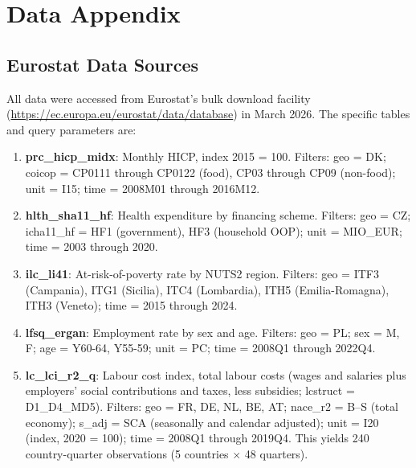 \documentclass[12pt]{article}
\begin{document}
\label{apep_main_text_end}
\newpage


\newpage
\appendix

\section{Data Appendix}
\label{app:data}

\subsection{Eurostat Data Sources}

All data were accessed from Eurostat's bulk download facility (\url{https://ec.europa.eu/eurostat/data/database}) in March 2026. The specific tables and query parameters are:

\begin{enumerate}
    \item \textbf{prc\_hicp\_midx}: Monthly HICP, index 2015 = 100. Filters: geo = DK; coicop = CP0111 through CP0122 (food), CP03 through CP09 (non-food); unit = I15; time = 2008M01 through 2016M12.

    \item \textbf{hlth\_sha11\_hf}: Health expenditure by financing scheme. Filters: geo = CZ; icha11\_hf = HF1 (government), HF3 (household OOP); unit = MIO\_EUR; time = 2003 through 2020.

    \item \textbf{ilc\_li41}: At-risk-of-poverty rate by NUTS2 region. Filters: geo = ITF3 (Campania), ITG1 (Sicilia), ITC4 (Lombardia), ITH5 (Emilia-Romagna), ITH3 (Veneto); time = 2015 through 2024.

    \item \textbf{lfsq\_ergan}: Employment rate by sex and age. Filters: geo = PL; sex = M, F; age = Y60-64, Y55-59; unit = PC; time = 2008Q1 through 2022Q4.

    \item \textbf{lc\_lci\_r2\_q}: Labour cost index, total labour costs (wages and salaries plus employers' social contributions and taxes, less subsidies; lcstruct = D1\_D4\_MD5). Filters: geo = FR, DE, NL, BE, AT; nace\_r2 = B--S (total economy); s\_adj = SCA (seasonally and calendar adjusted); unit = I20 (index, 2020 = 100); time = 2008Q1 through 2019Q4. This yields 240 country-quarter observations (5 countries $\times$ 48 quarters).
\end{enumerate}
\end{document}
